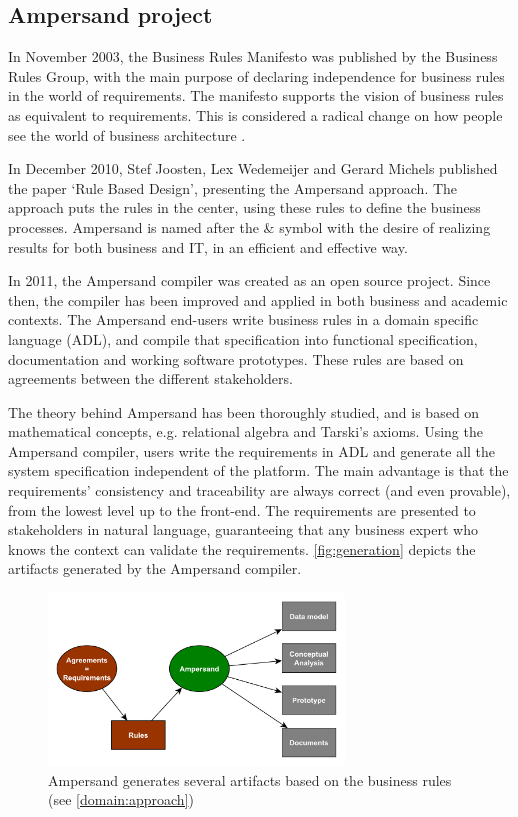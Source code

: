
\subsection{Ampersand project}
In November 2003, the Business Rules Manifesto  was published by the Business Rules Group, with the main purpose of declaring independence for business rules in the world of requirements.
The manifesto supports the vision of business rules as equivalent to requirements.
This is considered a radical change on how people see the world of business architecture . 

In December 2010, Stef Joosten, Lex Wedemeijer and Gerard Michels published the paper `Rule Based Design', presenting the Ampersand approach.
The approach puts the rules in the center, using these rules to define the business processes.
Ampersand is named after the \& symbol with the desire of realizing results for both business and IT, in an efficient and effective way.

In 2011, the Ampersand compiler was created as an open source project.
Since then, the compiler has been improved and applied in both business and academic contexts.
The Ampersand end-users write business rules in a domain specific language (ADL), and compile that specification into functional specification, documentation and working software prototypes.
%
These rules are based on agreements between the different stakeholders.

The theory behind Ampersand has been thoroughly studied, and is based on mathe\-matical concepts, e.g. relational algebra and Tarski's axioms.
Using the Ampersand compiler, users write the requirements in ADL and generate all the system specification independent of the platform.
The main advantage is that the requirements' consistency and traceability are always correct (and even provable), from the lowest level up to the front-end.
The requirements are presented to stakeholders in natural language, guaranteeing that any business expert who knows the context can validate the requirements.
\autoref{fig:generation} depicts the artifacts generated by the Ampersand compiler.
%
\begin{figure}[htb]
	\centering
	\includegraphics[width=0.7\textwidth]{Figures/Generation}
	\caption[Generated artifacts]{Ampersand generates several artifacts based on the business rules (see \autoref{domain:approach})}
	\label{fig:generation}
\end{figure}
%

